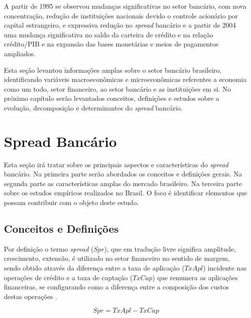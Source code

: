 \documentclass[
  12pt,
  12pt,
  openright,
  oneside,
  a4paper,
  chapter=TITLE,
  section=TITLE,
  subsection=TITLE,
  subsubsection=TITLE,
  english,
  portugues,
  sumario=tradicional]{abntex2}
\begin{document}
A partir de 1995 se observou mudanças significativas no setor bancário, com nova concentração, redução de instituições nacionais devido o controle acionário por capital estrangeiro, e expressiva redução no \emph{spread} bancário e a partir de 2004 uma mudança significativa no saldo da carteira de crédito e na relação crédito/PIB e na expansão das bases monetárias e meios de pagamentos ampliados.

Esta seção levantou informações amplas sobre o setor bancário brasileiro, identificando variáveis macroeconômicas e microeconômicas referentes a economia como um todo, setor financeiro, ao setor bancário e as instituições em si. No próximo capítulo serão levantados conceitos, definições e estudos sobre a evolução, decomposição e determinantes do \emph{spread} bancário.

\textual
\pagestyle{simple}
\parindent 1.50cm

\section{Spread Bancário}

Esta seção irá tratar sobre os principais aspectos e características do \emph{spread} bancário. Na primeira parte serão abordados os conceitos e definições gerais. Na segunda parte as características amplas do mercado brasileiro. Na terceira parte sobre os estudos empíricos realizados no Brasil. O foco é identificar elementos que possam contribuir com o objeto deste estudo.

\subsection{Conceitos e Definições}

Por definição o termo \emph{spread} (\(Spr\)), que em tradução livre significa amplitude, crescimento, extensão, é utilizado no setor financeiro no sentido de margem, sendo obtido através da diferença entre a taxa de aplicação (\(TxApl\)) incidente nas operações de crédito e a taxa de captação (\(TxCap\)) que remunera as aplicações financeiras, se configurando como a diferença entre a composição dos custos destas operações \cite{BCB:2000}.

\begin{equation}
Spr = TxApl - TxCap
\end{equation}
\end{document}

